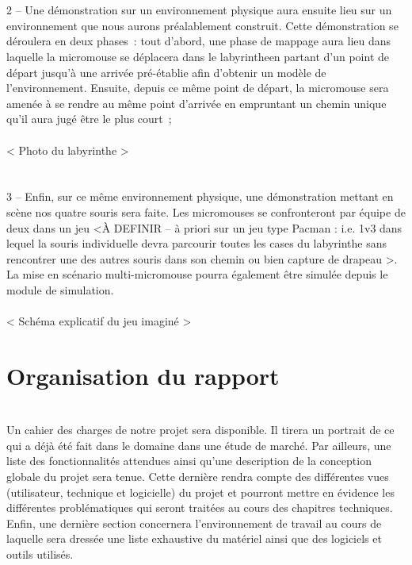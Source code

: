 \paragraph{}
{
\\2 – Une démonstration sur un environnement physique aura ensuite lieu sur un environnement que nous aurons préalablement construit. Cette démonstration se déroulera en deux phases : tout d’abord, une phase de mappage aura lieu dans laquelle la micromouse se déplacera dans le labyrintheen partant d’un point de départ jusqu’à une arrivée pré-établie afin d’obtenir un modèle de l’environnement. Ensuite, depuis ce même point de départ, la micromouse sera amenée à se rendre au même point d’arrivée en empruntant un chemin unique qu’il aura jugé être le plus court ;
\\
\\ < Photo du labyrinthe >
}

\paragraph{}
{
\\3 – Enfin, sur ce même environnement physique, une démonstration mettant en scène nos quatre souris sera faite. Les micromouses se confronteront par équipe de deux dans un jeu <À DEFINIR – à priori sur un jeu type Pacman : i.e. 1v3 dans lequel la souris individuelle devra parcourir toutes les cases du labyrinthe sans rencontrer une des autres souris dans son chemin ou bien capture de drapeau >. La mise en scénario multi-micromouse pourra également être simulée depuis le module de simulation.
\\
\\ < Schéma explicatif du jeu imaginé >
}

\section{Organisation du rapport}
\label{sec:introduction_organisation_du_rapport}

\paragraph{}
{
\\Un cahier des charges de notre projet sera disponible. Il tirera un portrait de ce qui a déjà été fait dans le domaine dans une étude de marché. Par ailleurs, une liste des fonctionnalités attendues ainsi qu'une description de la conception globale du projet sera tenue. Cette dernière rendra compte des différentes vues (utilisateur, technique et logicielle) du projet et pourront mettre en évidence les différentes problématiques qui seront traitées au cours des chapitres techniques. Enfin, une dernière section concernera l'environnement de travail au cours de laquelle sera dressée une liste exhaustive du matériel ainsi que des logiciels et outils utilisés.
}

